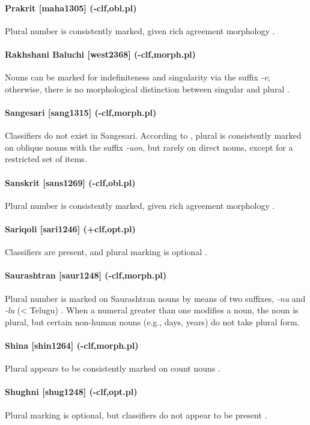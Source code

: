 \paragraph{Prakrit [maha1305] (-clf,obl.pl)}
Plural number is consistently marked, given rich agreement morphology \citep{Woolner1928}.
\paragraph{Rakhshani Baluchi [west2368] (-clf,morph.pl)}
Nouns can be marked for indefiniteness and singularity via the suffix {\it -e}; otherwise, there is no morphological distinction between singular and plural \citep[3ff.]{Barker1969}.
\paragraph{Sangesari [sang1315] (-clf,morph.pl)}
Classifiers do not exist in Sangesari. According to \citet[70ff.]{AzamiWindfuhr1972}, plural is consistently marked on oblique nouns with the suffix {\it -uon}, but rarely on direct nouns, except for a restricted set of items.
\paragraph{Sanskrit [sans1269] (-clf,obl.pl)}
Plural number is consistently marked, given rich agreement morphology \citep{Macdonell1910}.
\paragraph{Sariqoli [sari1246] (+clf,opt.pl)}
Classifiers are present, and plural marking is optional \citep{Paxalina1971}.
\paragraph{Saurashtran [saur1248] (-clf,morph.pl)}
Plural number is marked on Saurashtran nouns by means of two suffixes, {\it -nu} and {\it -lu} (< Telugu) \citep[45--6]{Ucida1979}. When a numeral greater than one modifies a noun, the noun is plural, but certain non-human nouns (e.g., days, years) do not take plural form. 
\paragraph{Shina [shin1264] (-clf,morph.pl)}
Plural appears to be consistently marked on count nouns \citep{Schmidtetal2008}.
\paragraph{Shughni [shug1248] (-clf,opt.pl)}
Plural marking is optional, but classifiers do not appear to be present \citep{Zarubin1960}.
